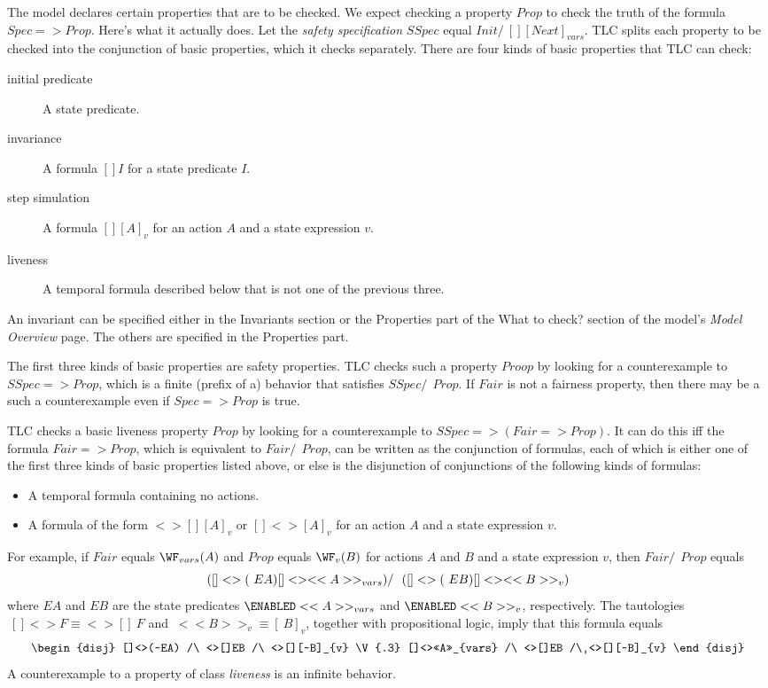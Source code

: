 \documentclass[fleqn,leqno]{article}
\begin{document}
The model declares certain properties that are to be checked.  We
expect checking a property $Prop$ to check the truth of the formula
$Spec=>Prop$.  Here's what it actually does.  Let the \emph{safety
specification} $SSpec$ equal
 $Init /\ [][Next]_{vars}$.
TLC splits each property to be checked into the conjunction of basic
properties, which it checks separately.  There are four kinds of basic
properties that TLC can check:
\begin{description}
\item[initial predicate] A state predicate.

\item[invariance] A formula $[]I$ for a state predicate $I$. 
   
\item[step simulation] A formula $[][A]_{v}$ for an action $A$ and a
state expression $v$.

\item[liveness] A temporal formula described below that is not one
of the previous three.
\end{description}
An invariant can be specified either in the \textsf{Invariants}
section or the \textsf{Properties} part of the \textsf{What to check?}
section of the model's \emph{Model Overview} page.  The others are
specified in the \textsf{Properties} part.

The first three kinds of basic properties are safety properties.  TLC
checks such a property $Proop$ by looking for a counterexample to
$SSpec=>Prop$, which is a finite (prefix of a) behavior that satisfies
$SSpec /\ ~Prop$.  If $Fair$ is not a fairness property, then there
may be a such a counterexample even if $Spec=>Prop$ is true.

TLC checks a basic liveness property $Prop$ by looking for a
counterexample to $SSpec=>(Fair => Prop)$.  It can do this iff the
formula $Fair=>Prop$, which is equivalent to
 $Fair /\ ~Prop$,
can be written as the conjunction of formulas, each of which is either
one of the first three kinds of basic properties listed above, or else
is the disjunction of conjunctions of the following kinds of formulas:
\begin{itemize}
\item A temporal formula containing no actions.

\item A formula of the form $<>[][A]_{v}$ or $[]<>[A]_{v}$ for an
action $A$ and a state expression $v$.
\end{itemize}
For example, if $Fair$ equals $\WF_{vars}(A)$ and
$Prop$ equals $\WF_{v}(B)$ for actions $A$ and $B$ and a state
expression $v$, then 
 $Fair /\ ~Prop$
equals
 \[ ([]<>(~EA) \/ []<><<A>>_{vars}) /\ ~([]<>(~EB) \/ []<><<B>>_{v})
 \]
where $EA$ and $EB$ are the state predicates $\ENABLED <<A>>_{vars}$
and $\ENABLED <<B>>_{v}$, respectively.  The tautologies $~[]<>F
\equiv <>[]~F$ and
 $~<<B>>_{v}\equiv[~B]_{v}$, together with propositional logic, imply that
this formula equals
  \[ \begin{disj}
      []<>(~EA) /\ <>[]EB /\ <>[][~B]_{v} \V{.3}
      []<><<A>>_{vars} /\ <>[]EB /\ <>[][~B]_{v}
     \end{disj}
 \]
A counterexample to a property of class \emph{liveness} is an infinite
behavior.
\end{document}
